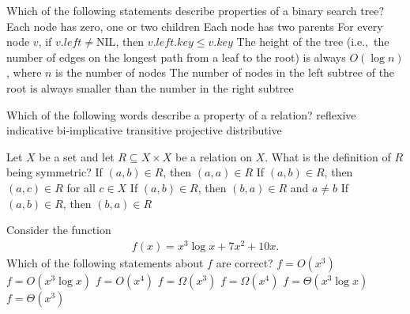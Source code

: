 Which of the following statements describe properties of a binary search tree?
\multipleanswers
\optionsstart
\answer Each node has zero, one or two children \correct
\answer Each node has two parents
\answer For every node $v$, if $v.left \neq \text{NIL}$, then $v.left.key \leq v.key$ \correct
\answer The height of the tree (i.e.,~the number of edges on the longest path from a leaf to the root) is always $O(\log n)$, where $n$ is the number of nodes
\answer The number of nodes in the left subtree of the root is always smaller than the number in the right subtree
\optionsend
{}


Which of the following words describe a property of a relation?
\multipleanswers
\optionsstart
\answer reflexive \correct
\answer indicative
\answer bi-implicative
\answer transitive \correct
\answer projective
\answer distributive
\optionsend
{}


Let $X$ be a set and let $R \subseteq X \times X$ be a relation on $X$.
What is the definition of $R$ being symmetric?
\oneanswer
\optionsstart
\answer If $(a,b) \in R$, then $(a,a) \in R$
\answer If $(a,b) \in R$, then $(a,c) \in R$ for all $c \in X$
\answer If $(a,b) \in R$, then $(b,a) \in R$ and $a \neq b$
\answer If $(a,b) \in R$, then $(b,a) \in R$ \correct
\optionsend
{}

Consider the function
\begin{align*}
  f(x) = x^{3}\log x + 7x^{2} + 10x.
\end{align*}
Which of the following statements about \(f\) are correct?
\multipleanswers
\optionsstart
\answer \(f = O(x^{3})\)
\answer \(f = O(x^{3}\log x)\) \correct
\answer \(f = O(x^{4})\) \correct
\answer \(f = \Omega(x^{3})\) \correct
\answer \(f = \Omega(x^{4})\)
\answer \(f = \Theta(x^{3}\log x)\) \correct
\answer \(f = \Theta(x^{3})\)
\optionsend
{}


